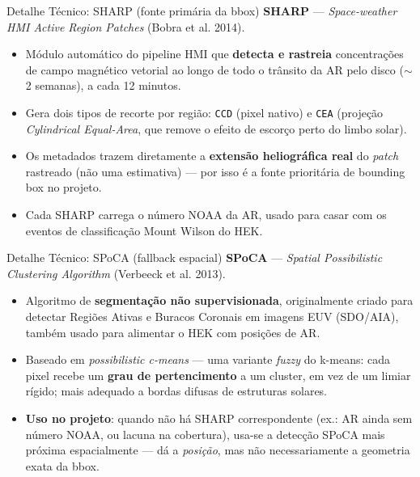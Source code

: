 \documentclass[aspectratio=169]{beamer}
\begin{document}
\begin{frame}{Detalhe Técnico: SHARP (fonte primária da bbox)}
  \textbf{SHARP} — \emph{Space-weather HMI Active Region Patches} (Bobra et al. 2014).
  \begin{itemize}
    \item Módulo automático do pipeline HMI que \textbf{detecta e rastreia} concentrações de campo magnético vetorial ao longo de todo o trânsito da AR pelo disco ($\sim$2 semanas), a cada 12 minutos.
    \item Gera dois tipos de recorte por região: \texttt{CCD} (pixel nativo) e \texttt{CEA} (projeção \emph{Cylindrical Equal-Area}, que remove o efeito de escorço perto do limbo solar).
    \item Os metadados trazem diretamente a \textbf{extensão heliográfica real} do \emph{patch} rastreado (não uma estimativa) — por isso é a fonte prioritária de bounding box no projeto.
    \item Cada SHARP carrega o número NOAA da AR, usado para casar com os eventos de classificação Mount Wilson do HEK.
  \end{itemize}
\end{frame}

\begin{frame}{Detalhe Técnico: SPoCA (fallback espacial)}
  \textbf{SPoCA} — \emph{Spatial Possibilistic Clustering Algorithm} (Verbeeck et al. 2013).
  \begin{itemize}
    \item Algoritmo de \textbf{segmentação não supervisionada}, originalmente criado para detectar Regiões Ativas e Buracos Coronais em imagens EUV (SDO/AIA), também usado para alimentar o HEK com posições de AR.
    \item Baseado em \emph{possibilistic c-means} — uma variante \emph{fuzzy} do k-means: cada pixel recebe um \textbf{grau de pertencimento} a um cluster, em vez de um limiar rígido; mais adequado a bordas difusas de estruturas solares.
    \item \textbf{Uso no projeto}: quando não há SHARP correspondente (ex.: AR ainda sem número NOAA, ou lacuna na cobertura), usa-se a detecção SPoCA mais próxima espacialmente — dá a \emph{posição}, mas não necessariamente a geometria exata da bbox.
  \end{itemize}
\end{frame}
\end{document}
